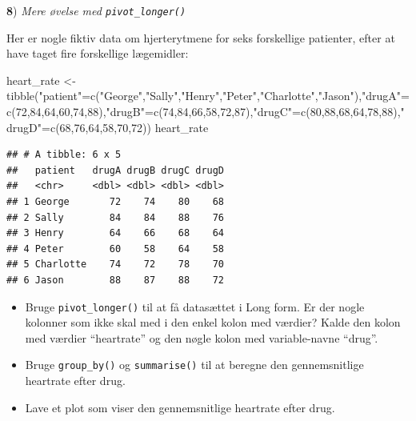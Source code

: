 \documentclass[
]{book}
\newenvironment{Shaded}{\begin{snugshade}}{\end{snugshade}}
\newcommand{\DecValTok}[1]{\textcolor[rgb]{0.00,0.00,0.81}{#1}}
\newcommand{\FunctionTok}[1]{\textcolor[rgb]{0.00,0.00,0.00}{#1}}
\newcommand{\NormalTok}[1]{#1}
\newcommand{\OtherTok}[1]{\textcolor[rgb]{0.56,0.35,0.01}{#1}}
\newcommand{\StringTok}[1]{\textcolor[rgb]{0.31,0.60,0.02}{#1}}
\providecommand{\tightlist}{%
  \setlength{\itemsep}{0pt}\setlength{\parskip}{0pt}}
\begin{document}
\textbf{8}) \emph{Mere øvelse med \texttt{pivot\_longer()}}

Her er nogle fiktiv data om hjerterytmene for seks forskellige patienter, efter at have taget fire forskellige lægemidler:

\begin{Shaded}
\begin{Highlighting}[]
\NormalTok{heart\_rate }\OtherTok{\textless{}{-}} \FunctionTok{tibble}\NormalTok{(}\StringTok{"patient"}\OtherTok{=}\FunctionTok{c}\NormalTok{(}\StringTok{"George"}\NormalTok{,}\StringTok{"Sally"}\NormalTok{,}\StringTok{"Henry"}\NormalTok{,}\StringTok{"Peter"}\NormalTok{,}\StringTok{"Charlotte"}\NormalTok{,}\StringTok{"Jason"}\NormalTok{),}\StringTok{"drugA"}\OtherTok{=}\FunctionTok{c}\NormalTok{(}\DecValTok{72}\NormalTok{,}\DecValTok{84}\NormalTok{,}\DecValTok{64}\NormalTok{,}\DecValTok{60}\NormalTok{,}\DecValTok{74}\NormalTok{,}\DecValTok{88}\NormalTok{),}\StringTok{"drugB"}\OtherTok{=}\FunctionTok{c}\NormalTok{(}\DecValTok{74}\NormalTok{,}\DecValTok{84}\NormalTok{,}\DecValTok{66}\NormalTok{,}\DecValTok{58}\NormalTok{,}\DecValTok{72}\NormalTok{,}\DecValTok{87}\NormalTok{),}\StringTok{"drugC"}\OtherTok{=}\FunctionTok{c}\NormalTok{(}\DecValTok{80}\NormalTok{,}\DecValTok{88}\NormalTok{,}\DecValTok{68}\NormalTok{,}\DecValTok{64}\NormalTok{,}\DecValTok{78}\NormalTok{,}\DecValTok{88}\NormalTok{),}\StringTok{"drugD"}\OtherTok{=}\FunctionTok{c}\NormalTok{(}\DecValTok{68}\NormalTok{,}\DecValTok{76}\NormalTok{,}\DecValTok{64}\NormalTok{,}\DecValTok{58}\NormalTok{,}\DecValTok{70}\NormalTok{,}\DecValTok{72}\NormalTok{))}
\NormalTok{heart\_rate}
\end{Highlighting}
\end{Shaded}

\begin{verbatim}
## # A tibble: 6 x 5
##   patient   drugA drugB drugC drugD
##   <chr>     <dbl> <dbl> <dbl> <dbl>
## 1 George       72    74    80    68
## 2 Sally        84    84    88    76
## 3 Henry        64    66    68    64
## 4 Peter        60    58    64    58
## 5 Charlotte    74    72    78    70
## 6 Jason        88    87    88    72
\end{verbatim}

\begin{itemize}
\tightlist
\item
  Bruge \texttt{pivot\_longer()} til at få datasættet i Long form. Er der nogle kolonner som ikke skal med i den enkel kolon med værdier? Kalde den kolon med værdier ``heartrate'' og den nøgle kolon med variable-navne ``drug''.
\item
  Bruge \texttt{group\_by()} og \texttt{summarise()} til at beregne den gennemsnitlige heartrate efter drug.
\item
  Lave et plot som viser den gennemsnitlige heartrate efter drug.
\end{itemize}
\end{document}
